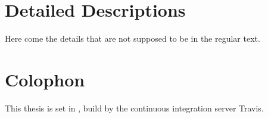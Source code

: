 \chapter{Detailed Descriptions}
\label{chapter:DetailedDescriptions}
Here come the details that are not supposed to be in the regular text.


\chapter{Colophon}
This thesis is set in \latex \cite{latex}, build by the continuous integration server Travis.
